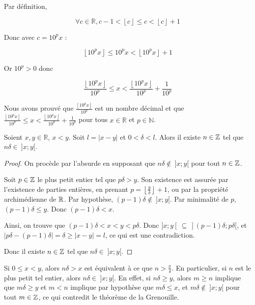 \documentclass[]{../templates/homework}
\providecommand{\floor}[1]{\left \lfloor #1 \right \rfloor }
\begin{document}
Par définition,

\begin{equation*}
\forall c \in \mathbb{R}, c-1 < \floor{c} \leqslant c < \floor{c} + 1
\end{equation*}

Donc avec $c = 10^px$ :

\begin{equation*}
	\floor{10^px} \leqslant 10^px < \floor{10^px} + 1
\end{equation*}

Or $10^p > 0$ donc

\begin{equation*}
	\frac{\floor{10^px}}{10^p} \leqslant x < \frac{\floor{10^px}}{10^p} + \frac{1}{10^p}
\end{equation*}

Nous avons prouvé que $\frac{\floor{10^px}}{10^p}$ est un nombre décimal et que $\frac{\floor{10^px}}{10^p} \leqslant x < \frac{\floor{10^px}}{10^p} + \frac{1}{10^p}$ pour tous $x \in \mathbb{R}$ et $p \in \mathbb{N}$.

\question
\vspace{10cm}

\subproblem
\question
\begin{thm}
	Soient $x,y\in\mathbb R$, $x<y$. Soit $l = |x-y|$ et $0 < \delta < l$. Alors il existe $n\in \mathbb Z$ tel que $n\delta \in\ ]x;y[$.
\end{thm}
\begin{proof}
	On procède par l'absurde en supposant que $n\delta \not\in\ ]x;y[$ pour tout $n\in\mathbb Z$.
	
	Soit $p\in\mathbb Z$ le plus petit entier tel que $p\delta > y$. Son existence est assurée par l'existence de parties entières, en prenant $p = \floor {\frac y \delta} + 1$, ou par la propriété archimédienne de $\mathbb R$.
	Par hypothèse, $(p-1) \delta \not \in\ ]x;y[$. Par minimalité de $p$, $(p-1)\delta \leq y$. Donc $(p-1)\delta < x$.
	
	Ainsi, on trouve que $(p-1)\delta < x < y < p\delta$. Donc $]x;y[\ \subseteq \  ](p-1)\delta; p\delta[$, et $|p\delta - (p-1)\delta| = \delta \geq |x-y| = l$, ce qui est une contradiction.
	
	Donc il existe $n\in\mathbb Z$ tel que $n\delta \in \ ]x;y[$.
\end{proof}

\question Si $0 \leq x <y$, alors $n\delta > x$ est équivalent à ce que $n> \frac x \delta$. En particulier, si $n$ est le plus petit tel entier, alors $n\delta \in \ ]x;y[$. En effet, si $n\delta \geq y$, alors $m\geq n$ implique que $m\delta \geq y$ et $m < n$ implique par hypothèse que $m\delta \leq x$, et $m\delta \not\in\ ]x;y[$ pour tout $m\in\mathbb Z$, ce qui contredit le théorème de la Grenouille.
\end{document}
